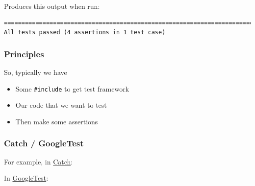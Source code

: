 Produces this output when run:

\begin{verbatim}
===============================================================================
All tests passed (4 assertions in 1 test case)

\end{verbatim}

\subsubsection{Principles}\label{principles}

So, typically we have

\begin{itemize}
\itemsep1pt\parskip0pt
\item
  Some \texttt{\#include} to get test framework
\item
  Our code that we want to test
\item
  Then make some assertions
\end{itemize}

\subsubsection{Catch / GoogleTest}\label{catch-googletest}

For example, in \href{https://github.com/philsquared/Catch}{Catch}:

\begin{Shaded}
\begin{Highlighting}[]
    \NormalTok{, } \NormalTok{) \{}
        \NormalTok{) == } \NormalTok{);}
        \NormalTok{) == } \NormalTok{);}
    \NormalTok{\}}
\end{Highlighting}
\end{Shaded}

In \href{https://code.google.com/p/googletest/}{GoogleTest}:

\begin{Shaded}
\begin{Highlighting}[]
      \NormalTok{));}
      \NormalTok{));}
    \NormalTok{\}}
\end{Highlighting}
\end{Shaded}

